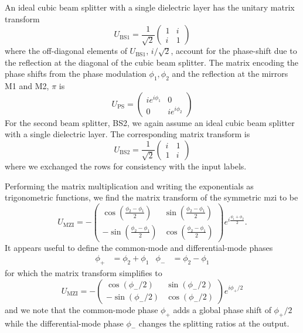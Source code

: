 An ideal cubic beam splitter with a single dielectric layer has the unitary matrix transform~\cite[p.~139]{Gerry2005}
\begin{equation}
	U_\text{BS1}
	=
	\frac{1}{\sqrt{2}}
	\begin{pmatrix}
		1 & i \\
		i & 1
	\end{pmatrix}
\end{equation}
where the off-diagonal elements of $U_\text{BS1}$, $i/\sqrt{2}$, account for the phase-shift due to the reflection at the diagonal of the cubic beam splitter.
The matrix encoding the phase shifts from the phase modulation $\phi_1,\phi_2$ and the reflection at the mirrors M1 and M2, $\pi$ is
\begin{equation}
	U_\text{PS}
	=
	\begin{pmatrix}
		ie^{i\phi_1} & 0 \\
		0 & ie^{i\phi_2}
	\end{pmatrix}
\end{equation}
For the second beam splitter, BS2, we again assume an ideal cubic beam splitter with a single dielectric layer.
The corresponding matrix transform is
\begin{equation}
	U_\text{BS2}
	=
	\frac{1}{\sqrt{2}}
	\begin{pmatrix}
		i & 1 \\
		1 & i
	\end{pmatrix}	
\end{equation}
where we exchanged the rows for consistency with the input labels.

Performing the matrix multiplication and writing the exponentials as trigonometric functions, we find the matrix transform of the symmetric \gls{mzi} to be
\begin{equation}
	U_\text{MZI}
	=
	-
	\begin{pmatrix}
		\cos\left(\frac{\phi_2-\phi_1}{2}\right) & \sin\left(\frac{\phi_2-\phi_1}{2}\right) \\
		-\sin\left(\frac{\phi_2-\phi_1}{2}\right) & \cos\left(\frac{\phi_2-\phi_1}{2}\right)
	\end{pmatrix}
	e^{i\frac{\phi_1+\phi_2}{2}}
	.
\end{equation}
It appears useful to define the common-mode and differential-mode phases
\begin{align}
	\phi_+
	&=
	\phi_2
	+
	\phi_1
	&
	\phi_-
	&=
	\phi_2-\phi_1
\end{align}
for which the matrix transform simplifies to
\begin{equation}
	U_\text{MZI}
	=
	-
	\begin{pmatrix}
		\cos(\phi_-/2) & \sin(\phi_-/2) \\
		-\sin(\phi_-/2) & \cos(\phi_-/2)
	\end{pmatrix}
	e^{i\phi_+/2}
\end{equation}
and we note that the common-mode phase $\phi_+$ adds a global phase shift of $\phi_+/2$ while the differential-mode phase $\phi_-$ changes the splitting ratios at the output.

